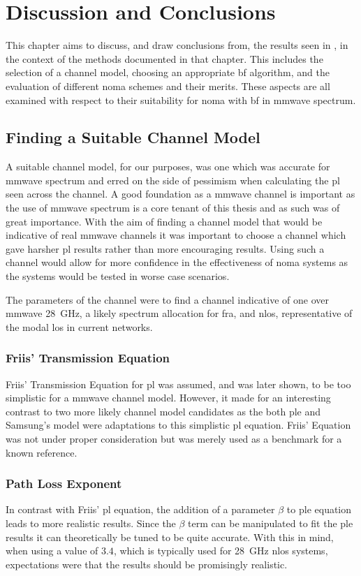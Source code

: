 \chapter{Discussion and Conclusions}
This chapter aims to discuss, and draw conclusions from, the results seen in , in the context of the methods documented in that chapter.
This includes the selection of a channel model, choosing an appropriate \ac{bf} algorithm, and the evaluation of different \ac{noma} schemes and their merits.
These aspects are all examined with respect to their suitability for \ac{noma} with \ac{bf} in \ac{mmwave} spectrum.

\section{Finding a Suitable Channel Model}
A suitable channel model, for our purposes, was one which was accurate for \ac{mmwave} spectrum and erred on the side of pessimism when calculating the \ac{pl} seen across the channel.
A good foundation as a \ac{mmwave} channel is important as the use of \ac{mmwave} spectrum is a core tenant of this thesis and as such was of great importance.
With the aim of finding a channel model that would be indicative of real \ac{mmwave} channels it was important to choose a channel which gave harsher \ac{pl} results rather than more encouraging results.
Using such a channel would allow for more confidence in the effectiveness of \ac{noma} systems as the systems would be tested in worse case scenarios.

\par
The parameters of the channel were to find a channel indicative of one over \ac{mmwave} \SI{28}{\giga\hertz}, a likely spectrum allocation for \ac{fra}, and \ac{nlos}, representative of the modal \ac{los} in current networks.

\subsection{Friis' Transmission Equation}
Friis' Transmission Equation for \ac{pl} was assumed, and was later shown, to be too simplistic for a \ac{mmwave} channel model.
However, it made for an interesting contrast to two more likely channel model candidates as the both \ac{ple} and Samsung's model were adaptations to this simplistic \ac{pl} equation.
Friis' Equation was not under proper consideration but was merely used as a benchmark for a known reference.

\subsection{Path Loss Exponent}
In contrast with Friis' \ac{pl} equation, the addition of a parameter $\beta$ to \ac{ple} equation leads to more realistic results.
Since the $\beta$ term can be manipulated to fit the \ac{ple} results it can theoretically be tuned to be quite accurate.
With this in mind, when using a value of $3.4$, which is typically used for \SI{28}{\giga\hertz} \ac{nlos} systems, expectations were that the results should be promisingly realistic.


